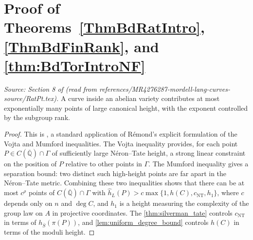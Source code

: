 \section{Proof of Theorems~\ref{ThmBdRatIntro}, \ref{ThmBdFinRank}, and \ref{thm:BdTorIntroNF}}

\begin{lemma}
  \label{lem:vojtamumford}
  \textit{Source: Section 8 of \cite{MR4276287-mordell-lang-curves} (read from references/MR4276287-mordell-lang-curves-source/RatPt.tex).}
  A curve inside an abelian variety contributes at most exponentially many points
  of large canonical height, with the exponent controlled by the subgroup rank.
\end{lemma}

\begin{proof}
  This is \cite[Corollary~2.3]{DGH1p}, a standard application of Rémond's
  explicit formulation \cite{Remond:Decompte, remond:vojtasup} of the
  Vojta and Mumford inequalities.
  The Vojta inequality provides, for each point \(P \in C(\overline{\mathbb{Q}}) \cap \Gamma\)
  of sufficiently large Néron--Tate height, a strong linear constraint on
  the position of \(P\) relative to other points in \(\Gamma\).
  The Mumford inequality gives a separation bound: two distinct such high-height points
  are far apart in the Néron--Tate metric.
  Combining these two inequalities shows that there can be at most \(c^\rho\)
  points of \(C(\overline{\mathbb{Q}}) \cap \Gamma\) with
  \(\hat{h}_L(P) > c\max\{1, h(C), c_{\mathrm{NT}}, h_1\}\),
  where \(c\) depends only on \(n\) and \(\deg C\), and \(h_1\) is a height
  measuring the complexity of the group law on \(A\) in projective coordinates.
  The \cref{thm:silverman_tate} controls \(c_{\mathrm{NT}}\) in terms of
  \(h_{\overline{S}}(\pi(P))\), and \cref{lem:uniform_degree_bound} controls
  \(h(C)\) in terms of the moduli height.
\end{proof}

